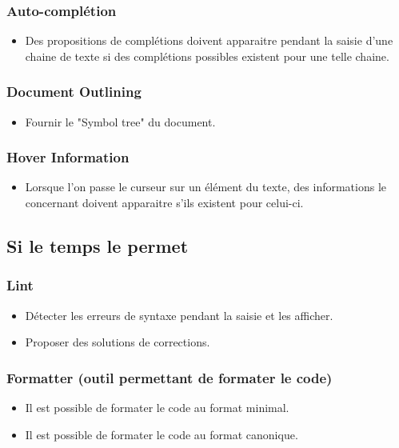 \documentclass[
    iict, %
    il, %
]{heig-tb}
\begin{document}
\subsubsection*{Auto-complétion}
\begin{itemize}
    \item Des propositions de complétions doivent apparaitre pendant la saisie d'une chaine de texte si des complétions possibles existent pour une telle chaine.
\end{itemize}

\subsubsection*{Document Outlining}
\begin{itemize}
    \item Fournir le "Symbol tree" du document.
\end{itemize}

\subsubsection*{Hover Information}
\begin{itemize}
    \item Lorsque l'on passe le curseur sur un élément du texte, des informations le concernant doivent apparaitre s'ils existent pour celui-ci.
\end{itemize}

\subsection*{Si le temps le permet}

\subsubsection*{Lint}
\begin{itemize}
    \item Détecter les erreurs de syntaxe pendant la saisie et les afficher.
    \item Proposer des solutions de corrections.
\end{itemize}

\subsubsection*{Formatter (outil permettant de formater le code)}
\begin{itemize}
    \item Il est possible de formater le code au format minimal.
    \item Il est possible de formater le code au format canonique.
\end{itemize}
\end{document}
